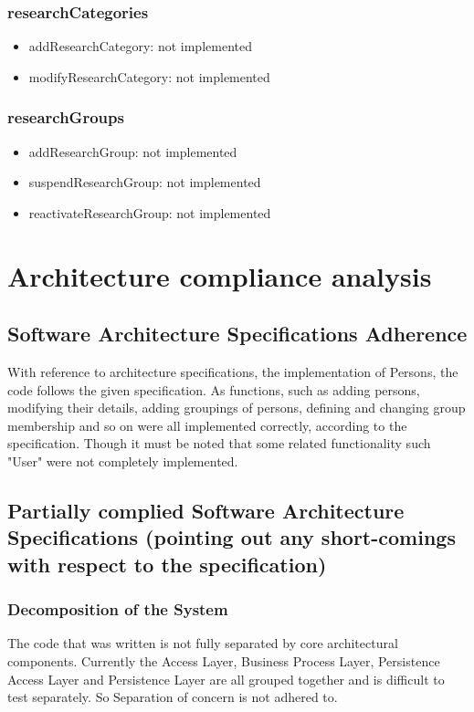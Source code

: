 \documentclass{article}
\begin{document}
\subsubsection{researchCategories}
\begin{itemize}
	\item addResearchCategory: not implemented
	\item modifyResearchCategory: not implemented
\end{itemize}

\subsubsection{researchGroups}
\begin{itemize}
	\item addResearchGroup: not implemented
	\item suspendResearchGroup: not implemented
	\item reactivateResearchGroup: not implemented
\end{itemize}

\newpage

\section{Architecture compliance analysis}
\subsection{Software Architecture Specifications Adherence}
With reference to architecture specifications, the implementation of Persons, the code follows the given specification. As functions, such as adding persons, modifying their details, adding groupings of persons, defining and changing group membership and so on were all implemented correctly, according to the specification. Though it must be noted that some related functionality such "User" were not completely implemented.

\subsection{Partially complied Software Architecture Specifications (pointing out any short-comings with respect to the specification)}

\subsubsection{Decomposition of the System}
The code that was written is not fully separated by core architectural components. Currently the Access Layer, Business Process Layer, Persistence Access Layer and Persistence Layer are all grouped together and is difficult to test separately. So Separation of concern is not adhered to.
\end{document}

